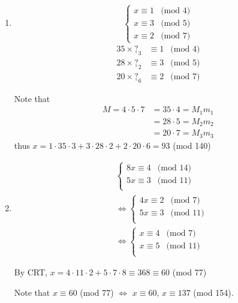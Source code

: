 \begin{example}
    \begin{enumerate}
        \item \[
            \begin{cases}
                x \equiv 1 & \mbox{(mod 4)} \\
                x \equiv 3 & \mbox{(mod 5)} \\
                x \equiv 2 & \mbox{(mod 7)}
            \end{cases}    
        \]
        \begin{align*}
            35 \times \underline{?}_\text{3} &\equiv 1 & \mbox{(mod 4)}\\
            28 \times \underline{?}_\text{2} &\equiv 3 & \mbox{(mod 5)}\\
            20 \times \underline{?}_\text{6} &\equiv 2 & \mbox{(mod 7)}
        \end{align*}
        
        Note that
        \begin{align*}
            M=4\cdot 5\cdot 7 &= 35 \cdot 4 = M_1m_1 \\
            &= 28 \cdot 5 = M_2m_2 \\
            &= 20 \cdot 7 = M_3m_3
        \end{align*}
        thus $x=1\cdot 35\cdot 3 + 3\cdot 28\cdot 2 + 2 \cdot 20 \cdot 6 = 93$ (mod 140)
        \item \begin{align*}
            & \begin{cases}
                8x \equiv 4 & \mbox{(mod 14)} \\
                5x \equiv 3 & \mbox{(mod 11)} \\
            \end{cases} \\
            & \Leftrightarrow \begin{cases}
                4x \equiv 2 & \mbox{(mod 7)} \\
                5x \equiv 3 & \mbox{(mod 11)} \\
            \end{cases} \\
            & \Leftrightarrow \begin{cases}
                x \equiv 4 & \mbox{(mod 7)} \\
                x \equiv 5 & \mbox{(mod 11)} \\
            \end{cases}
        \end{align*}

        By CRT, $x=4 \cdot 11 \cdot 2 + 5 \cdot 7 \cdot 8 \equiv 368 \equiv 60$ (mod 77)

        Note that $x \equiv 60$ (mod 77) $\Leftrightarrow$ $x \equiv 60$, $x \equiv 137$ (mod 154).
    \end{enumerate}
\end{example}